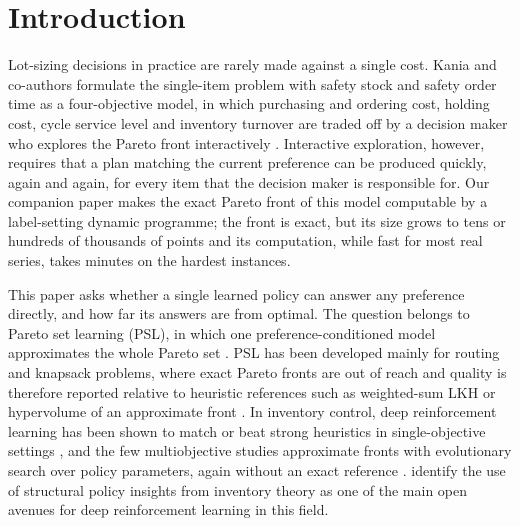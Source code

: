 \documentclass[preprint,12pt,authoryear]{elsarticle}
\begin{document}
\section{Introduction}\label{sec:intro}

Lot-sizing decisions in practice are rarely made against a single cost. Kania and co-authors
formulate the single-item problem with safety stock and safety order time as a four-objective
model, in which purchasing and ordering cost, holding cost, cycle service level and inventory
turnover are traded off by a decision maker who explores the Pareto front interactively
\citep{Kania2021ICCL,Kania2022CIE,Kania2024DESMILS}. Interactive exploration, however, requires
that a plan matching the current preference can be produced quickly, again and again, for every
item that the decision maker is responsible for. Our companion paper makes the exact Pareto front
of this model computable by a label-setting dynamic programme; the front is exact, but its size
grows to tens or hundreds of thousands of points and its computation, while fast for most real
series, takes minutes on the hardest instances.

This paper asks whether a single learned policy can answer any preference directly, and how far
its answers are from optimal. The question belongs to Pareto set learning (PSL), in which one
preference-conditioned model approximates the whole Pareto set \citep{Lin2022PSL}. PSL has been
developed mainly for routing and knapsack problems, where exact Pareto fronts are out of reach and
quality is therefore reported relative to heuristic references such as weighted-sum LKH or
hypervolume of an approximate front \citep{Chen2023NHDE,Lu2024GAPL}. In inventory control, deep
reinforcement learning has been shown to match or beat strong heuristics in single-objective
settings \citep{Gijsbrechts2022MSOM,Dehaybe2024,vanHezewijk2023,vanHezewijk2025}, and the few
multiobjective studies approximate fronts with evolutionary search over policy parameters, again
without an exact reference \citep{Kotecha2025MORSE,Rachman2025}. \citet{Boute2022Roadmap} identify
the use of structural policy insights from inventory theory as one of the main open avenues for
deep reinforcement learning in this field.
\end{document}
